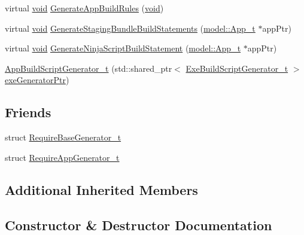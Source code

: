 \begin{DoxyCompactItemize}
\item 
virtual \hyperlink{_t_e_m_p_l_a_t_e__cdef_8h_ac9c84fa68bbad002983e35ce3663c686}{void} \hyperlink{classninja_1_1_app_build_script_generator__t_a0527da8e4112996385bae11f5c44d0c2}{Generate\+App\+Build\+Rules} (\hyperlink{_t_e_m_p_l_a_t_e__cdef_8h_ac9c84fa68bbad002983e35ce3663c686}{void})
\item 
virtual \hyperlink{_t_e_m_p_l_a_t_e__cdef_8h_ac9c84fa68bbad002983e35ce3663c686}{void} \hyperlink{classninja_1_1_app_build_script_generator__t_a2bbc4734805b9be1e86f73a8dc7cc826}{Generate\+Staging\+Bundle\+Build\+Statements} (\hyperlink{structmodel_1_1_app__t}{model\+::\+App\+\_\+t} $\ast$app\+Ptr)
\item 
virtual \hyperlink{_t_e_m_p_l_a_t_e__cdef_8h_ac9c84fa68bbad002983e35ce3663c686}{void} \hyperlink{classninja_1_1_app_build_script_generator__t_a44662951282ee699d224498bf356b907}{Generate\+Ninja\+Script\+Build\+Statement} (\hyperlink{structmodel_1_1_app__t}{model\+::\+App\+\_\+t} $\ast$app\+Ptr)
\item 
\hyperlink{classninja_1_1_app_build_script_generator__t_a3eee07ced599483cb27b83cea9c9b1eb}{App\+Build\+Script\+Generator\+\_\+t} (std\+::shared\+\_\+ptr$<$ \hyperlink{classninja_1_1_exe_build_script_generator__t}{Exe\+Build\+Script\+Generator\+\_\+t} $>$ \hyperlink{structninja_1_1_require_exe_generator__t_a2fc1256089c9c0afb7b160085fecc749}{exe\+Generator\+Ptr})
\end{DoxyCompactItemize}
\subsection*{Friends}
\begin{DoxyCompactItemize}
\item 
struct \hyperlink{classninja_1_1_app_build_script_generator__t_ab9382de245c70f2507eecb5feb3d6663}{Require\+Base\+Generator\+\_\+t}
\item 
struct \hyperlink{classninja_1_1_app_build_script_generator__t_a91562bfdee7b8bee558845b780facf51}{Require\+App\+Generator\+\_\+t}
\end{DoxyCompactItemize}
\subsection*{Additional Inherited Members}


\subsection{Constructor \& Destructor Documentation}
